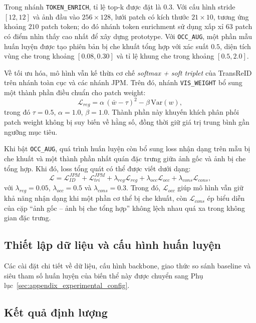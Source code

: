 Trong nhánh \texttt{TOKEN\_ENRICH}, tỉ lệ top-k được đặt là $0.3$. Với cấu hình
stride $[12,12]$ và ảnh đầu vào $256 \times 128$, lưới patch có kích thước
$21 \times 10$, tương ứng khoảng $210$ patch token; do đó nhánh token
enrichment sử dụng xấp xỉ $63$ patch có điểm nhìn thấy cao nhất để xây dựng
prototype. Với \texttt{OCC\_AUG}, một phần mẫu huấn luyện được tạo phiên bản bị
che khuất tổng hợp với xác suất $0.5$, diện tích vùng che trong khoảng
$[0.08, 0.30]$ và tỉ lệ khung che trong khoảng $[0.5, 2.0]$.

Về tối ưu hóa, mô hình vẫn kế thừa cơ chế \textit{softmax + soft triplet} của
TransReID trên nhánh toàn cục và các nhánh JPM. Trên đó, nhánh
\texttt{VIS\_WEIGHT} bổ sung một thành phần điều chuẩn cho patch weight:
\begin{equation}
\mathcal{L}_{reg}
= \alpha \, (\bar{w} - \tau)^2 - \beta \, \mathrm{Var}(w),
\end{equation}
trong đó $\tau = 0.5$, $\alpha = 1.0$, $\beta = 1.0$. Thành phần này khuyến
khích phân phối patch weight không bị suy biến về hằng số, đồng thời giữ giá trị
trung bình gần ngưỡng mục tiêu.

Khi bật \texttt{OCC\_AUG}, quá trình huấn luyện còn bổ sung loss nhận dạng trên
mẫu bị che khuất và một thành phần nhất quán đặc trưng giữa ảnh gốc và ảnh bị
che tổng hợp. Khi đó, loss tổng quát có thể được viết dưới dạng:
\begin{equation}
\mathcal{L}
= \mathcal{L}_{ID}^{JPM}
+ \mathcal{L}_{tri}^{JPM}
+ \lambda_{reg}\mathcal{L}_{reg}
+ \lambda_{occ}\mathcal{L}_{occ}
+ \lambda_{cons}\mathcal{L}_{cons},
\end{equation}
với $\lambda_{reg} = 0.05$, $\lambda_{occ} = 0.5$ và $\lambda_{cons} = 0.3$.
Trong đó, $\mathcal{L}_{occ}$ giúp mô hình vẫn giữ khả năng nhận dạng khi một
phần cơ thể bị che khuất, còn $\mathcal{L}_{cons}$ ép biểu diễn của cặp
``ảnh gốc -- ảnh bị che tổng hợp'' không lệch nhau quá xa trong không gian đặc
trưng.

\subsection{Thiết lập dữ liệu và cấu hình huấn luyện}
Các cài đặt chi tiết về dữ liệu, cấu hình backbone, giao thức so sánh baseline
và siêu tham số huấn luyện của biến thể này được chuyển sang
Phụ lục~\ref{sec:appendix_experimental_config}.

\subsection{Kết quả định lượng}

